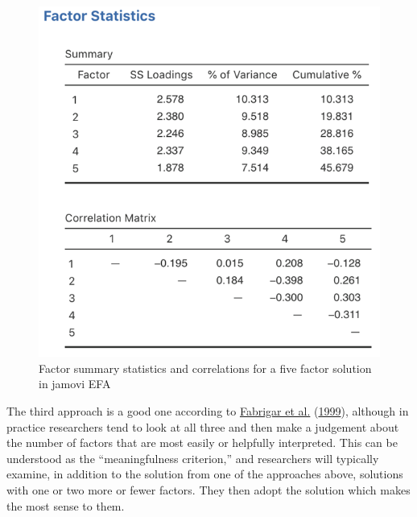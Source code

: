 \documentclass[
]{book}
\begin{document}
\begin{figure}

{\centering \includegraphics[width=1\linewidth]{img/factoranalysis/fa6} 

}

\caption{Factor summary statistics and correlations for a five factor solution in jamovi EFA}\label{fig:fa6}
\end{figure}

The third approach is a good one according to \protect\hyperlink{ref-Fabrigar1999}{Fabrigar et al.} (\protect\hyperlink{ref-Fabrigar1999}{1999}), although in practice researchers tend to look at all three and then make a judgement about the number of factors that are most easily or helpfully interpreted. This can be understood as the ``meaningfulness criterion,'' and researchers will typically examine, in addition to the solution from one of the approaches above, solutions with one or two more or fewer factors. They then adopt the solution which makes the most sense to them.
\end{document}
